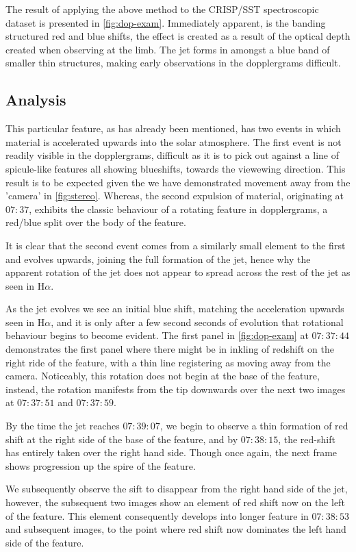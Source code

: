The result of applying the above method to the CRISP/SST spectroscopic dataset is presented in \cref{fig:dop-exam}.
Immediately apparent, is the banding structured red and blue shifts, the effect is created as a result of the optical depth created when observing at the limb. 
The jet forms in amongst a blue band of smaller thin structures, making early observations in the dopplergrams difficult.  

\subsection{Analysis}
This particular feature, as has already been mentioned, has two events in which material is accelerated upwards into the solar atmosphere.
The first event is not readily visible in the dopplergrams, difficult as it is to pick out against a line of spicule-like features all showing blueshifts, towards the viewewing direction.
This result is to be expected given the we have demonstrated movement away from the 'camera' in \cref{fig:stereo}.
Whereas, the second expulsion of material, originating at $07:37$, exhibits the classic behaviour of a rotating feature in dopplergrams, a red/blue split over the body of the feature. 
 
It is clear that the second event comes from a similarly small element to the first and evolves upwards, joining the full formation of the jet, hence why the apparent rotation of the jet does not appear to spread across the rest of the jet as seen in H$\alpha$.

As the jet evolves we see an initial blue shift, matching the acceleration upwards seen in H$\alpha$, and it is only after a few second seconds of evolution that rotational behaviour begins to become evident.
The first panel in \cref{fig:dop-exam} at $07:37:44$ demonstrates the first panel where there might be in inkling of redshift on the right ride of the feature, with a thin line registering as moving away from the camera.
Noticeably, this rotation does not begin at the base of the feature, instead, the rotation manifests from the tip downwards over the next two images at $07:37:51$ and $07:37:59$.

By the time the jet reaches $07:39:07$, we begin to observe a thin formation of red shift at the right side of the base of the feature, and by $07:38:15$, the red-shift has entirely taken over the right hand side.
Though once again, the next frame shows progression up the spire of the feature.

We subsequently observe the sift to disappear from the right hand side of the jet, however, the subsequent two images show an element of red shift now on the left of the feature.
This element consequently develops into longer feature in $07:38:53$ and subsequent images, to the point where red shift now dominates the left hand side of the feature.

